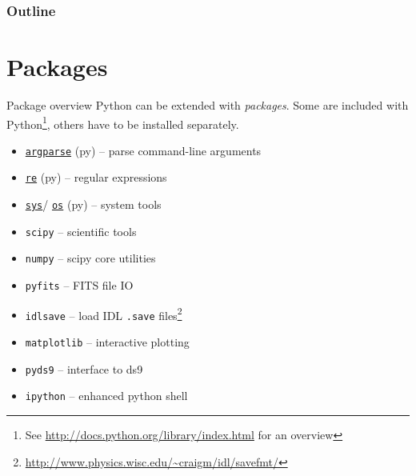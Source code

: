 \documentclass[xetex,10pt]{beamer}
\def\spacer{\vspace*{1em}}
\begin{document}
\begin{frame}
    \frametitle{Outline}
    \setcounter{tocdepth}{2}
    \tableofcontents
\end{frame}

\section{Packages}

\begin{frame}[fragile]{Package overview}
	Python can be extended with \emph{packages}. Some are included with Python\footnote[frame]{See \url{http://docs.python.org/library/index.html} for an overview}, others have to be installed separately.
	\spacer
	\begin{itemize}
		\item \href{http://docs.python.org/library/argparse.html}{\texttt{argparse}} (py) -- parse command-line arguments
		\item \href{http://docs.python.org/library/re.html}{\texttt{re}} (py) -- regular expressions
		\item \href{http://docs.python.org/library/sys.html}{\texttt{sys}}/%
		\href{http://docs.python.org/library/os.html}{\texttt{os}} (py) -- system tools
		\pause
		\item \texttt{scipy} -- scientific tools
		\item \texttt{numpy} -- scipy core utilities
		\pause
		\item \texttt{pyfits} -- FITS file IO
		\item \texttt{idlsave} -- load IDL \texttt{.save} files\footnote[frame]{\url{http://www.physics.wisc.edu/~craigm/idl/savefmt/}}
		\pause
		\item \texttt{matplotlib} -- interactive plotting
		\item \texttt{pyds9} -- interface to ds9
		\pause
		\item \texttt{ipython} -- enhanced python shell
	\end{itemize}
\end{frame}
\end{document}
